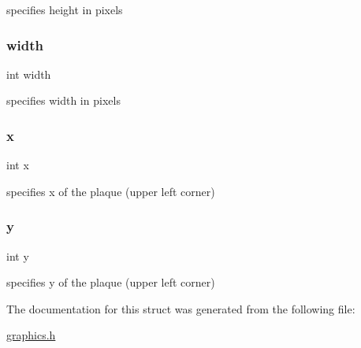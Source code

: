 specifies height in pixels 

\mbox{\label{struct_mouse_a2474a5474cbff19523a51eb1de01cda4}} 
\subsubsection{\texorpdfstring{width}{width}}
{\footnotesize\ttfamily int width}



specifies width in pixels 

\mbox{\label{struct_mouse_a6150e0515f7202e2fb518f7206ed97dc}} 
\subsubsection{\texorpdfstring{x}{x}}
{\footnotesize\ttfamily int x}



specifies x of the plaque (upper left corner) 

\mbox{\label{struct_mouse_a0a2f84ed7838f07779ae24c5a9086d33}} 
\subsubsection{\texorpdfstring{y}{y}}
{\footnotesize\ttfamily int y}



specifies y of the plaque (upper left corner) 



The documentation for this struct was generated from the following file\+:\begin{DoxyCompactItemize}
\item 
\hyperlink{graphics_8h}{graphics.\+h}\end{DoxyCompactItemize}
